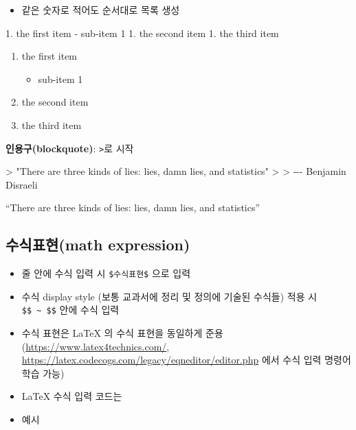 \documentclass[
  11pt,
]{krantz}
\makeatletter
\newenvironment{Shaded}{\begin{snugshade}}{\end{snugshade}}
\newcommand{\AttributeTok}[1]{\textcolor[rgb]{0.61,0.61,0.61}{#1}}
\newcommand{\NormalTok}[1]{#1}
\newcommand{\SpecialStringTok}[1]{\textcolor[rgb]{0.5,0.5,0.5}{#1}}
\providecommand{\tightlist}{%
  \setlength{\itemsep}{0pt}\setlength{\parskip}{0pt}}
\newenvironment{kframe}{%
\medskip{}
\setlength{\fboxsep}{.8em}
 \def\at@end@of@kframe{}%
 \ifinner\ifhmode%
  \def\at@end@of@kframe{\end{minipage}}%
  \begin{minipage}{\columnwidth}%
 \fi\fi%
 \def\FrameCommand##1{\hskip\@totalleftmargin \hskip-\fboxsep
 \colorbox{shadecolor}{##1}\hskip-\fboxsep
     \hskip-\linewidth \hskip-\@totalleftmargin \hskip\columnwidth}%
 \MakeFramed {\advance\hsize-\width
   \@totalleftmargin\z@ \linewidth\hsize
   \@setminipage}}%
 {\par\unskip\endMakeFramed%
 \at@end@of@kframe}
\renewenvironment{quote}{\begin{kframe}}{\end{kframe}}
\makeatother
\begin{document}
\begin{itemize}
\tightlist
\item
  같은 숫자로 적어도 순서대로 목록 생성
\end{itemize}

\begin{Shaded}
\begin{Highlighting}[]
\SpecialStringTok{1. }\NormalTok{the first item}
\SpecialStringTok{   {-} }\NormalTok{sub{-}item 1}
\SpecialStringTok{1. }\NormalTok{the second item}
\SpecialStringTok{1. }\NormalTok{the third item}
\end{Highlighting}
\end{Shaded}

\begin{enumerate}
\def\labelenumi{\arabic{enumi}.}
\tightlist
\item
  the first item

  \begin{itemize}
  \tightlist
  \item
    sub-item 1
  \end{itemize}
\item
  the second item
\item
  the third item
\end{enumerate}

\textbf{인용구(blockquote)}: \texttt{\textgreater{}}로 시작

\begin{Shaded}
\begin{Highlighting}[]
\AttributeTok{\textgreater{} "There are three kinds of lies: lies, damn lies, and statistics"}
\AttributeTok{\textgreater{}}
\AttributeTok{\textgreater{} {-}{-}{-} Benjamin Disraeli}
\end{Highlighting}
\end{Shaded}

\begin{quote}
``There are three kinds of lies: lies, damn lies, and statistics''

\end{quote}

\hypertarget{uxc218uxc2dduxd45cuxd604math-expression}{%
\subsection{수식표현(math expression)}\label{uxc218uxc2dduxd45cuxd604math-expression}}

\begin{itemize}
\tightlist
\item
  줄 안에 수식 입력 시 \texttt{\$수식표현\$} 으로 입력
\item
  수식 display style (보통 교과서에 정리 및 정의에 기술된 수식들) 적용 시 \texttt{\$\$\ \textasciitilde{}\ \$\$} 안에 수식 입력
\item
  수식 표현은 LaTeX 의 수식 표현을 동일하게 준용(\url{https://www.latex4technics.com/}, \url{https://latex.codecogs.com/legacy/eqneditor/editor.php} 에서 수식 입력 명령어 학습 가능)
\item
  LaTeX 수식 입력 코드는
\item
  예시
\end{itemize}
\end{document}
